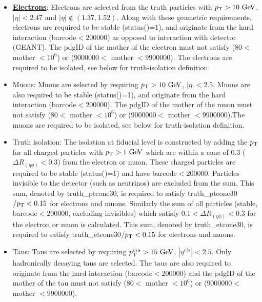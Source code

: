 \begin{itemize}
\item \underline{\textbf{Electrons}}: Electrons are selected from the truth particles with
  $\pt > 10 \gev$, $|\eta|<2.47$ and $|\eta|\notin(1.37,1.52)$. Along
  with these geometric requirements, electrons are required to be
  stable (status()=1), and originate from the hard interaction
  (barcode$<200000$) as opposed to interaction with detector
  (GEANT). The pdgID of the mother of the electron must not satisfy ($80<$ mother $<10^{6}$)
  or ($9000000<$ mother $<9900000$).
  The electrons are required to be isolated, see below for
  truth-isolation definition.
\item Muons: Muons are selected by requiring $\pt > 10 \gev$,
  $|\eta|<2.5$. Muons are also required to be stable (status()=1), and
  originate from the hard interaction (barcode$<200000$). The pdgID of the mother of the muon must not satisfy 
  ($80<$ mother $<10^{6}$) or ($9000000<$ mother $<9900000$).The muons
  are required to be isolated, see below for truth-isolation
  definition.
\item Truth isolation: The isolation at fiducial level is constructed
  by adding the $p_{\text{T}}$ for all charged particles with $\pt > 1 \gev$
  which are within a cone of 0.3 ($\Delta R_{(\eta\phi)}<0.3$) from
  the electron or muon. These charged particles are required to be
  stable (status()=1) and have barcode$<200000$. 
  Particles invisible to the detector (such as neutrinos) are excluded from the sum.
  This sum, denoted by truth\_ptcone30, is required to satisfy
  truth\_ptcone30$/p_{\text{T}}<0.15$ for electrons and muons.
  Similarly the sum of all particles
  (stable, barcode$<200000$, excluding invisibles) 
  which satisfy $0.1<\Delta R_{(\eta\phi)}<0.3$ for the electron or muon is calculated. This sum, denoted by
  truth\_etcone30, is required to satisfy truth\_etcone30$/p_{\text{T}}<0.15$ for electrons and muons.
\item Taus: Taus are selected by requiring $\pt^{vis} > 15 \gev$,
  $|\eta^{vis}|<2.5$. Only hadronically decaying taus are selected. The taus are also required to originate from
the hard interaction (barcode$<200000$) and the pdgID of the mother of the tau must not satisfy ($80<$ mother $<10^{6}$)
  or ($9000000<$ mother $<9900000$).
\end{itemize}
